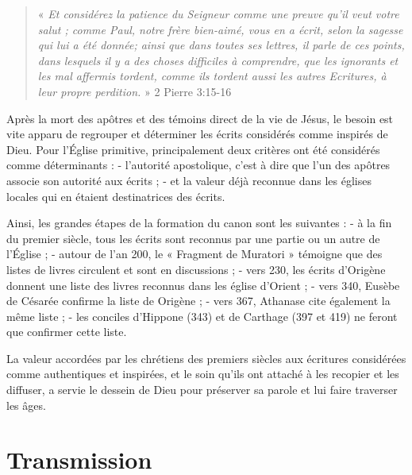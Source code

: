 \begin{small}
\begin{quote}
« \emph{Et considérez la patience du Seigneur comme une preuve qu'il veut votre salut ; comme Paul, notre frère bien-aimé, vous en a écrit, selon la sagesse qui lui a été donnée; ainsi que dans toutes ses lettres, il parle de ces points, dans lesquels il y a des choses difficiles à comprendre, que les ignorants et les mal affermis tordent, comme ils tordent aussi les autres Ecritures, à leur propre perdition.} » 2 Pierre 3:15-16
\end{quote}

Après la mort des apôtres et des témoins direct de la vie de Jésus, le besoin est vite apparu de regrouper et déterminer les écrits considérés comme inspirés de Dieu. Pour l'Église primitive, principalement deux critères ont été considérés comme déterminants :\newline
- l'autorité apostolique, c'est à dire que l'un des apôtres associe son autorité aux écrits ;\newline
- et la valeur déjà reconnue dans les églises locales qui en étaient destinatrices des écrits.\bigskip

Ainsi, les grandes étapes de la formation du canon sont les suivantes :\newline
- à la fin du premier siècle, tous les écrits sont reconnus par une partie ou un autre de l'Église ;\newline
- autour de l'an 200, le « Fragment de Muratori » témoigne que des listes de livres circulent et sont en discussions ;\newline
- vers 230, les écrits d'Origène donnent une liste des livres reconnus dans les église d'Orient ;\newline
- vers 340, Eusèbe de Césarée confirme la liste de Origène ;\newline
- vers 367, Athanase cite également la même liste ;\newline
- les conciles d'Hippone (343) et de Carthage (397 et 419) ne feront que confirmer cette liste.\bigskip

La valeur accordées par les chrétiens des premiers siècles aux écritures considérées comme authentiques et inspirées, et le soin qu'ils ont attaché à les recopier et les diffuser, a servie le dessein de Dieu pour préserver sa parole et lui faire traverser les âges.

\section*{Transmission}


\end{small}
